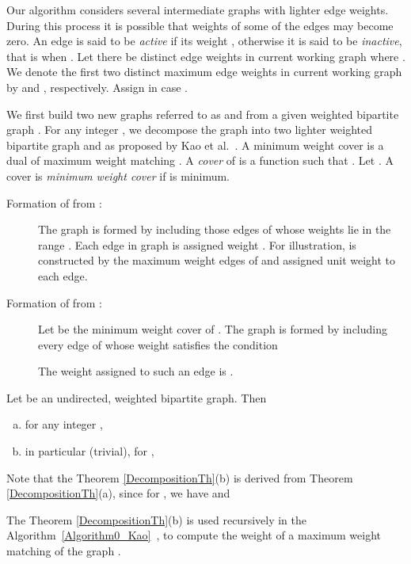 \documentclass[runningheads,a4paper]{llncs}
\begin{document}
Our algorithm considers several intermediate graphs with  lighter edge weights. During this process it is possible that weights of some of the
edges may 
become zero. 
An edge  is said to be {\it active} if
its weight , otherwise it is said to be {\it inactive}, that is when . Let there be  distinct edge weights in current
working graph where .
We denote the first two distinct maximum edge weights in current
working graph by  and , respectively.
Assign  in case .

We first build two new graphs referred to as  and  from
a given weighted bipartite graph . For any integer , we decompose the graph  into two lighter weighted bipartite graph  and
 as proposed by Kao et al.~\cite{kao99,kao02}. A minimum weight cover is a dual of maximum weight matching \cite{kao02}. A \emph{cover}
of  is a function  such that
. Let . A cover  is \emph{minimum weight cover} if  is minimum.
\begin{description}

\item[Formation of  from :] The graph
 is formed by including those edges  of  whose weights
  lie in the range . Each edge  in graph
 is assigned weight . For illustration,  is
constructed by the maximum weight edges of  and assigned unit weight
to each edge.

\item[Formation of  from :] Let
 be the minimum weight cover of . The graph  is
formed by including every edge  of  whose weight satisfies the condition 
 
The weight assigned to such an
edge is .
\end{description}

\begin{theorem}
\label{DecompositionTh}
Let  be an undirected, weighted bipartite graph.
Then
\begin{enumerate}[(a)]
\item for any integer , 
\item in particular (trivial), for ,

\end{enumerate}
\end{theorem}

Note that the Theorem \ref{DecompositionTh}(b) is derived from
Theorem \ref{DecompositionTh}(a), since for , we have  and 
 
The Theorem
\ref{DecompositionTh}(b) is used recursively in the Algorithm~\ref{Algorithm0_Kao}~\cite{kao02},
to compute the weight of a maximum weight matching of the graph .
\end{document}
